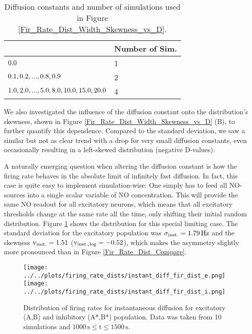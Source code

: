 \documentclass[10pt,a4paper]{article}
\begin{document}
\begin{table}
\begin{tabu}{|l|l|}
\hline
{} & \textbf{Number of Sim.} \\ \hline
$\rm 0.0$ & 1 \\ \hline
$\rm 0.1,0.2,...,0.8,0.9$ & 2 \\ \hline
$\rm 1.0,2.0,...,5.0,8.0,10.0,15.0,20.0$ & 4 \\ \hline
\end{tabu}
\caption{Diffusion constants and number of simulations used in Figure \ref{Fir_Rate_Dist_Width_Skewness_vs_D}.}
\label{Diff_Test_Constants_Sim_Number}
\end{table}

We also investigated the influence of the diffusion constant onto the distribution's skewness, shown in Figure \ref{Fir_Rate_Dist_Width_Skewness_vs_D} (B), to further quantify this dependence. Compared to the standard deviation, we saw a similar but not as clear trend with a drop for very small diffusion constants, even occasionally resulting in a left-skewed distribution (negative D-values).

A naturally emerging question when altering the diffusion constant is how the firing rate behaves in the absolute limit of infinitely fast diffusion. In fact, this case is quite easy to implement simulation-wise: One simply has to feed all NO-sources into a single scalar variable of NO concentration. This will provide the same NO readout for all excitatory neurons, which means that all excitatory thresholds change at the same rate all the time, only shifting their initial random distribution. Figure \ref{Fir_Rate_Dist_Instant_compare} shows the distribution for this special limiting case. The standard deviation for the excitatory population was $\mathrm{\sigma_{\rm inst.} = 1.79\, Hz}$ and the skewness $\mathrm{v_{\rm inst.} = 1.51}$ ($\mathrm{v_{\rm inst.,log} = -0.52}$), which makes the asymmetry slightly more pronounced than in Figure \ref{Fir_Rate_Dist_Compare}.  
\begin{figure}
\texttt{[image: ../../plots/firing\_rate\_dists/instant\_diff\_fir\_dist\_e.png]}
\texttt{[image: ../../plots/firing\_rate\_dists/instant\_diff\_fir\_dist\_i.png]}
\caption{Distribution of firing rates for instantaneous diffusion for excitatory (A,B) and inhibitory (A*,B*) population. Data was taken from 10 simulations and $\mathrm{1000\,s \leq t \leq 1500\,s}$.}
\label{Fir_Rate_Dist_Instant_compare}
\end{figure}
\end{document}
